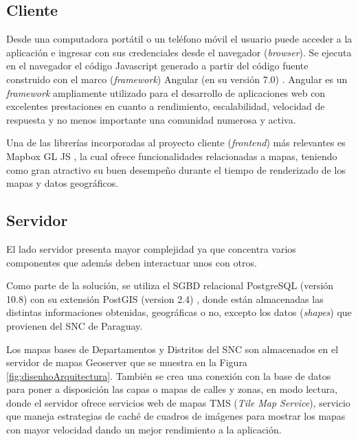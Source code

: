\subsection{Cliente}

Desde una computadora portátil o un teléfono móvil el usuario puede acceder a la aplicación e ingresar con sus credenciales desde el navegador (\textit{browser}). Se ejecuta en el navegador el código Javascript \citep{JavaScript} generado a partir del código fuente construido con el marco (\textit{framework}) Angular (en su versión 7.0) \citep{Angular}. Angular es un \textit{framework} ampliamente utilizado para el desarrollo de aplicaciones web con excelentes prestaciones en cuanto a rendimiento, escalabilidad, velocidad de respuesta y no menos importante una comunidad numerosa y activa. 

Una de las librerías incorporadas al proyecto cliente (\textit{frontend}) más relevantes es Mapbox GL JS \citep{MapboxJS}, la cual ofrece funcionalidades relacionadas a mapas, teniendo como gran atractivo su buen desempeño durante el tiempo de renderizado de los mapas y datos geográficos.

\subsection{Servidor}

El lado servidor presenta mayor complejidad ya que concentra varios componentes que además deben interactuar unos con otros.

Como parte de la solución, se utiliza el SGBD relacional PostgreSQL (versión 10.8) \citep{PostgreSQL} con su extensión PostGIS (version 2.4) \citep{PostGIS}, donde están almacenadas las distintas informaciones obtenidas, geográficas o no, excepto los datos (\textit{shapes}) que provienen del SNC de Paraguay.

Los mapas bases de Departamentos y Distritos del SNC son almacenados en el servidor de mapas Geoserver \citep{GeoServer} que se muestra en la Figura \ref{fig:disenhoArquitectura}. También se crea una conexión con la base de datos para poner a disposición las capas o mapas de calles y zonas, en modo lectura, donde el servidor ofrece servicios web de mapas TMS (\textit{Tile Map Service}), servicio que maneja estrategias de caché de cuadros de imágenes para mostrar los mapas con mayor velocidad dando un mejor rendimiento a la aplicación.

